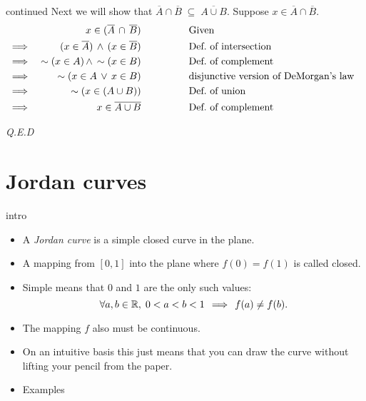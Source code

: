 \documentclass[handout,landscape]{beamer}
\begin{document}
\begin{frame}{continued}
Next we will show that $\overline{A} \cap \overline{B} \; \subseteq \; \overline{A \cup B}$.
Suppose $x \in \overline{A} \cap \overline{B}$.
\begin{align*}
 &          &  x \in ( \overline{A} \, \cap \, \overline{B}) \rule{48pt}{0pt} & \mbox{Given} & \\
 & \implies &  (x \in \overline{A}) \, \land  \, (x \in \overline{B}) \rule{48pt}{0pt} & \mbox{Def.\ of intersection} & \\
 & \implies & \lnot (x \in A) \, \land  \, \lnot (x \in B) \rule{48pt}{0pt} & \mbox{Def.\ of complement } & \\
 & \implies & \lnot (x \in A \, \lor \, x \in B) \rule{48pt}{0pt} & \mbox{disjunctive version of DeMorgan's law} & \\
 & \implies & \lnot (x \in (A \cup B)) \rule{48pt}{0pt} & \mbox{Def.\ of union} & \\
 & \implies & x \in \overline{A \cup B} \rule{48pt}{0pt} & \mbox{Def.\ of complement} & \\
\end{align*}

\rule{0pt}{0pt} \hfill {\em Q.E.D} 

\end{frame}

\section{Jordan curves}


\begin{frame}{intro}
\begin{itemize}
\item A {\em Jordan curve} is a simple closed curve in the plane. \pause
\item A mapping from $[0,1]$ into the plane where $f(0) = f(1)$ is called closed.\pause
\item Simple means that $0$ and $1$ are the only such values: \pause \newline
\[ \forall a, b \in {\mathbb R}, \; 0<a<b<1 \, \implies \, f(a) \neq f(b). \] \pause
\item The mapping $f$ also must be continuous.  \pause
\item On an intuitive basis this just means that you can draw the 
curve without lifting your pencil from the paper.\pause
\item Examples
\end{itemize}
\end{frame}
\end{document}
